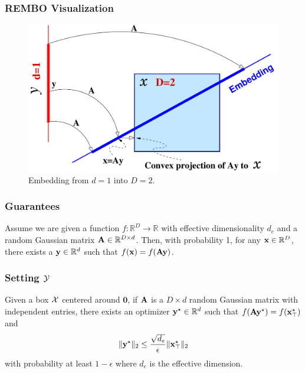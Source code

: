 \documentclass[grey]{beamer}
\begin{document}
 \begin{frame}
 \frametitle{REMBO Visualization}
  \begin{figure}[t!]
\centering
  \includegraphics[scale=0.28]{../paper/figures/projection.pdf}
  \caption{Embedding from $d=1$ into $D=2$. 
  }
  \label{fig:proj}
  \vspace{-1em}
\end{figure}
 \end{frame}
 
 \begin{frame}
  \frametitle{Guarantees}
  \begin{theorem}
   \label{prop:1}
   Assume we are given a function $f: \mathbb{R}^{D} \rightarrow \mathbb{R}$ with effective dimensionality $d_e$ and a random Gaussian matrix $\mathbf{A} \in \mathbb{R}^{D\times d}$. Then, with probability 1, for any $\mathbf{x} \in \mathbb{R}^D$, there exists a $ \mathbf{y} \in \mathbb{R}^d$ such that $f(\mathbf{x}) = f(\mathbf{A}\mathbf{y})$.
  \end{theorem}
 \end{frame}
 
 \begin{frame}
  \frametitle{Setting $\cal Y$}
  \begin{theorem}
   \label{prop:2}
   Given a box $\cal X$ centered around $\mathbf{0}$, if $\mathbf{A}$ is a $D\times d$ random Gaussian matrix 
   with independent entries,
   there exists an optimizer $\mathbf{y}^\star \in \mathbb{R}^{d}$ such that $f(\mathbf{A}\mathbf{y}^\star) = f(\mathbf{x}^\star_\top)$ and $$\|\mathbf{y}^\star\|_2 \leq \frac{\sqrt{d_e}}{\epsilon}\|\mathbf{x}^{\star}_\top\|_2$$ with probability at least $1-\epsilon$ where $d_e$ is
   the effective dimension.
 \end{theorem}
 \end{frame}
 
\end{document}
